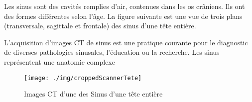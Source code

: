 Les sinus sont des cavités remplies d'air, contenues dans les os crâniens. Ils ont des formes différentes selon l'âge. La figure suivante est une vue de trois plans (transversale, sagittale et frontale) des sinus d'une tête entière.

L'acquisition d'images CT de sinus est une pratique courante pour le diagnostic de diverses pathologies sinusales, l'éducation ou la recherche. Les sinus représentent une anatomie complexe 

\begin{figure}[ht!]
\centering
\texttt{[image: ./img/croppedScannerTete]}
\caption{Images CT d'une des Sinus d'une tête entière}
\label{head}
\end{figure}